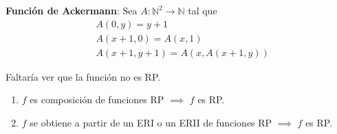 %
\textbf{Función de Ackermann}: Sea $A: \mathbb{N}^2 \to \mathbb{N}$ tal que
\begin{align*}
     &A(0,y) = y+1 \\
     &A(x+1,0) = A(x,1) \\
     &A(x+1,y+1) = A(x, A(x+1,y))
\end{align*}

Faltaría ver que la función no es RP.

\bigskip

\begin{teorema}{}{}
   \begin{enumerate}
       \item $f$ es composición de funciones RP $\implies$ $f$ es RP.
       \item $f$ se obtiene a partir de un ERI o un ERII de funciones RP
           $\implies$ $f$ es RP.
   \end{enumerate} 
\end{teorema}

